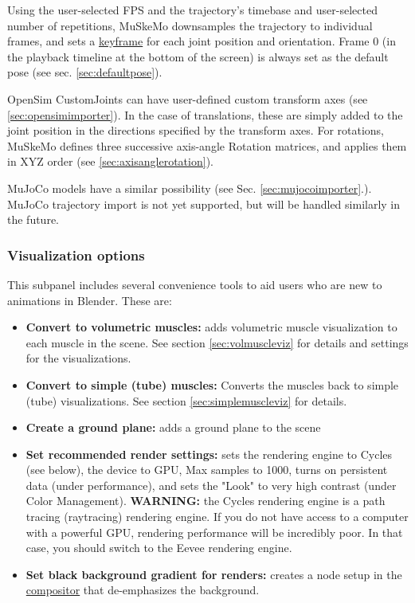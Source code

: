 \documentclass{article}
\begin{document}
Using the user-selected FPS and the trajectory's timebase and user-selected number of repetitions, MuSkeMo downsamples the trajectory to individual frames, and sets a \href{https://docs.blender.org/manual/en/latest/animation/keyframes/index.html}{keyframe} for each joint position and orientation. Frame 0 (in the playback timeline at the bottom of the screen) is always set as the default pose (see sec. \ref{sec:defaultpose}).

OpenSim CustomJoints can have user-defined custom transform axes (see \ref{sec:opensimimporter}). In the case of translations, these are simply added to the joint position in the directions specified by the transform axes. For rotations, MuSkeMo defines three successive axis-angle Rotation matrices, and applies them in XYZ order (see \ref{sec:axisanglerotation}).

MuJoCo models have a similar possibility (see Sec. \ref{sec:mujocoimporter}.). MuJoCo trajectory import is not yet supported, but will be handled similarly in the future.

\subsubsection{Visualization options}

This subpanel includes several convenience tools to aid users who are new to animations in Blender. These are:

\begin{itemize}
    \item \textbf{Convert to volumetric muscles:} adds volumetric muscle visualization to each muscle in the scene. See section \ref{sec:volmuscleviz} for details and settings for the visualizations.
    \item \textbf{Convert to simple (tube) muscles:} Converts the muscles back to simple (tube) visualizations. See section \ref{sec:simplemuscleviz} for details.
    \item \textbf{Create a ground plane:} adds a ground plane to the scene
    \item \textbf{Set recommended render settings:} sets the rendering engine to Cycles (see below), the device to GPU, Max samples to 1000, turns on persistent data (under performance), and sets the "Look" to very high contrast (under Color Management). \textbf{WARNING:} the Cycles rendering engine is a path tracing (raytracing) rendering engine. If you do not have access to a computer with a powerful GPU, rendering performance will be incredibly poor. In that case, you should switch to the Eevee rendering engine.
    \item \textbf{Set black background gradient for renders:} creates a node setup in the \href{https://docs.blender.org/manual/en/latest/compositing/index.html}{compositor} that de-emphasizes the background.
\end{itemize}
\end{document}
